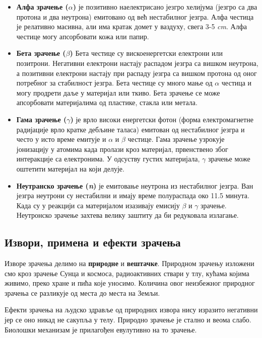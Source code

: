 \documentclass[12pt,a4paper,serbian,oneside]{book}
\begin{document}
\begin{itemize}

  \item \textbf{Алфа зрачење ($\alpha$)} је позитивно наелектрисано језгро хелијума (језгро са два протона и два неутрона) емитовано од већ нестабилног језгра. Алфа честица је релативно масивна, али има кратак домет у ваздуху, свега 3-5 \textit{cm}. Алфа честице могу апсорбовати кожа или папир.

  \item \textbf{Бета зрачење ($\beta$)} Бета честице су вискоенергетски електрони или позитрони. Негативни електрони настају распадом језгра са вишком неутрона, а позитивни електрони настају при распаду језгра са вишком протона од оног потребног за стабилност језгра. Бета честице су много мање од $\alpha$ честица и могу продрети даље у материјал или ткиво. Бета зрачење се може апсорбовати материјалима од пластике, стакла или метала.
  
  \item \textbf{Гама зрачење ($\gamma$)} је врло високи енергетски фотон (форма електромагнетне радијације врло кратке дебљине таласа) емитован од нестабилног језгра и често у исто време емитује и $\alpha$ и $\beta$ честице. Гама зрачење узрокује јонизацију у атомима када пролази кроз материјал, првенствено због интеракције са електронима. У одсуству густих материјала, $\gamma$ зрачење може оштетити материјал на који делује.

\item \textbf{Неутранско зрачење (\textit{n})} је емитовање неутрона из нестабилног језгра. Ван језгра неутрони су нестабилни и имају време полураспада око 11.5 минута. Када су у реакцији са материјалом изазивају емисију $\beta$ и $\gamma$ зрачење. Неутронско зрачење захтева велику заштиту да би редуковала излагање.

\end{itemize}

\subsection{Извори, примена и ефекти зрачења}

Изворе зрачења делимо на \textbf{природне} и \textbf{вештачке}. Природном зрачењу изложени смо кроз зрачење Сунца и космоса, радиоактивних ствари у тлу, кућама којима живимо, преко хране и пића које уносимо. Количина овог неизбежног природног зрачења се разликује од места до места на Земљи.

Ефекти зрачења на људско здравље од природних извора нису изразито негативни јер се оно никад не сакупља у телу. Природно зрачење је стално и веома слабо. Биолошки механизам је прилагођен евулутивно на то зрачење.
\end{document}
